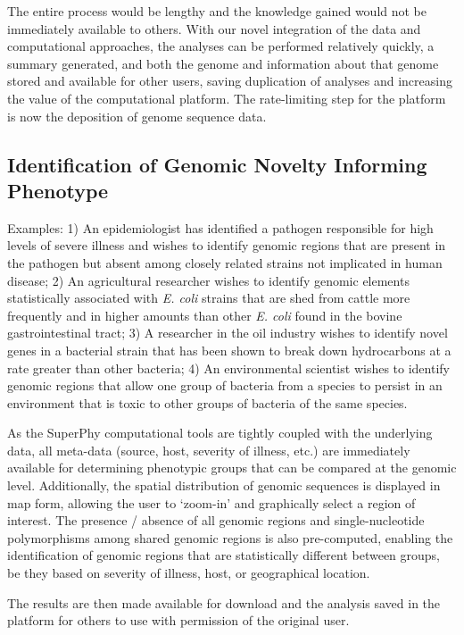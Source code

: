 \documentclass[a4paper,twoside]{article}
\begin{document}
The entire process would be lengthy and the knowledge gained would not be immediately available to others. With our novel integration of the data and computational approaches, the analyses can be performed relatively quickly, a summary generated, and both the genome and
information about that genome stored and available for other users, saving duplication of analyses and increasing the value of the computational platform. The rate-limiting step for the platform is now the deposition of genome sequence data.

\subsection{Identification of Genomic Novelty Informing Phenotype}
Examples: 1) An epidemiologist has identified a pathogen responsible for high levels of severe illness and wishes to identify genomic regions that are present in the pathogen but absent among closely related strains not implicated in human disease; 2) An agricultural researcher wishes to identify genomic elements statistically associated with \textit{E. coli} strains that are shed from cattle more frequently and in higher amounts than other \textit{E. coli} found in the bovine gastrointestinal tract; 3) A researcher in the oil industry wishes to identify novel genes in a bacterial strain that has been shown to break down hydrocarbons at a rate greater than other bacteria; 4) An environmental scientist wishes to identify genomic regions that allow one group of bacteria from a species to persist in an environment that is toxic to other groups of bacteria of the same species.

As the SuperPhy computational tools are tightly coupled with the underlying data, all meta-data (source, host, severity of illness, etc.) are immediately available for determining phenotypic groups that can be compared at the genomic level. Additionally, the spatial distribution of genomic sequences is displayed in map form, allowing the user to `zoom-in' and graphically select a region of interest. The presence / absence of all genomic regions and single-nucleotide polymorphisms among shared genomic regions is also pre-computed, enabling the identification of genomic regions that are statistically different between groups, be they based on severity of illness, host, or geographical location.

The results are then made available for download and the analysis saved in the platform for others to use with permission of the original user.
\end{document}
